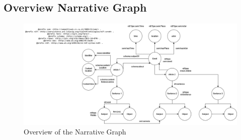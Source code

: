 \documentclass[
hf, %
]{ceurart}
\begin{document}
\subsection{Overview Narrative Graph}
\begin{figure}
    \includegraphics[scale=0.45]{Images/overview_graph.png}
\caption{Overview of the Narrative Graph}
\label{fig:graph_overview}
\end{figure}
\end{document}
